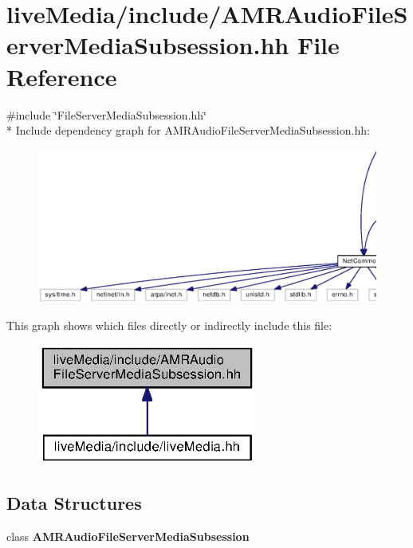\section{live\+Media/include/\+A\+M\+R\+Audio\+File\+Server\+Media\+Subsession.hh File Reference}
\label{AMRAudioFileServerMediaSubsession_8hh}
{\ttfamily \#include \char`\"{}File\+Server\+Media\+Subsession.\+hh\char`\"{}}\\*
Include dependency graph for A\+M\+R\+Audio\+File\+Server\+Media\+Subsession.\+hh\+:
\nopagebreak
\begin{figure}[H]
\begin{center}
\leavevmode
\includegraphics[width=350pt]{AMRAudioFileServerMediaSubsession_8hh__incl}
\end{center}
\end{figure}
This graph shows which files directly or indirectly include this file\+:
\nopagebreak
\begin{figure}[H]
\begin{center}
\leavevmode
\includegraphics[width=205pt]{AMRAudioFileServerMediaSubsession_8hh__dep__incl}
\end{center}
\end{figure}
\subsection*{Data Structures}
\begin{DoxyCompactItemize}
\item 
class {\bf A\+M\+R\+Audio\+File\+Server\+Media\+Subsession}
\end{DoxyCompactItemize}

